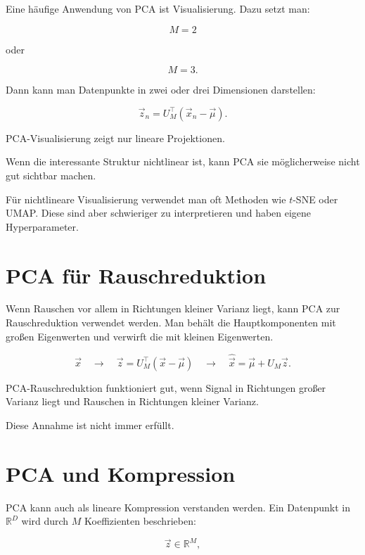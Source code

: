 Eine häufige Anwendung von PCA ist Visualisierung.
Dazu setzt man:

\[
    M=2
\]

oder

\[
    M=3.
\]

Dann kann man Datenpunkte in zwei oder drei Dimensionen darstellen:

\[
    \vec{z}_n
    =
    U_M^{\top}
    (\vec{x}_n-\vec{\mu}).
\]

\begin{notebox}
PCA-Visualisierung zeigt nur lineare Projektionen.

Wenn die interessante Struktur nichtlinear ist, kann PCA sie möglicherweise nicht gut sichtbar machen.
\end{notebox}

Für nichtlineare Visualisierung verwendet man oft Methoden wie \(t\)-SNE oder UMAP.
Diese sind aber schwieriger zu interpretieren und haben eigene Hyperparameter.

\section{PCA für Rauschreduktion}

Wenn Rauschen vor allem in Richtungen kleiner Varianz liegt, kann PCA zur Rauschreduktion verwendet werden.
Man behält die Hauptkomponenten mit großen Eigenwerten und verwirft die mit kleinen Eigenwerten.

\[
    \vec{x}
    \quad
    \longrightarrow
    \quad
    \vec{z}
    =
    U_M^{\top}
    (\vec{x}-\vec{\mu})
    \quad
    \longrightarrow
    \quad
    \hat{\vec{x}}
    =
    \vec{\mu}
    +
    U_M\vec{z}.
\]

\begin{conceptbox}
PCA-Rauschreduktion funktioniert gut, wenn Signal in Richtungen großer Varianz liegt und Rauschen in Richtungen kleiner Varianz.

Diese Annahme ist nicht immer erfüllt.
\end{conceptbox}

\section{PCA und Kompression}

PCA kann auch als lineare Kompression verstanden werden.
Ein Datenpunkt in \(\mathbb{R}^D\) wird durch \(M\) Koeffizienten beschrieben:

\[
    \vec{z}\in\mathbb{R}^M,
\]

